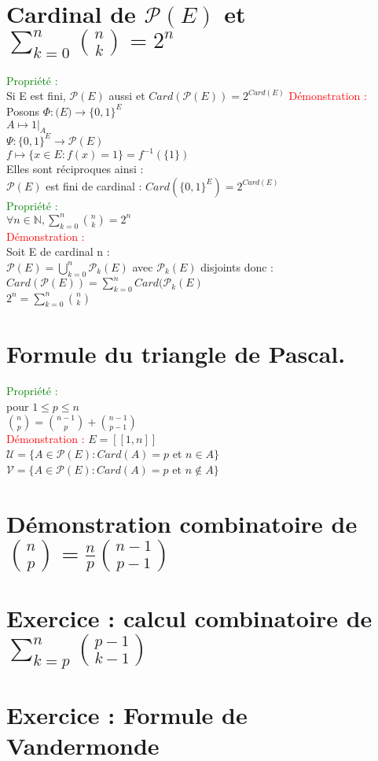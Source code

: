 \documentclass{article}
\begin{document}
\section{Cardinal de $\mathcal P (E)$ et $\sum_{k=0}^n \binom{n}{k}=2^n$ }
\textcolor{green}{Propriété :} \\
Si E est fini, $\mathcal P(E)$ aussi et $Card(\mathcal P(E))=2^{Card(E)}$
\textcolor{red}{Démonstration :} \\
Posons $\Phi : \mathcal (E) \rightarrow \lbrace 0,1 \rbrace^E$ \\
$A \mapsto 1|_{A}$ \\
$\Psi : \lbrace 0,1 \rbrace^E \rightarrow \mathcal P(E)$ \\
$f \mapsto \lbrace x \in E : f(x)=1 \rbrace=f^{-1}(\lbrace 1 \rbrace)$ \\
Elles sont réciproques ainsi : \\
$ \mathcal P(E)$ est fini de cardinal : $Card(\lbrace 0,1 \rbrace^E)=2^{Card(E)} $ \\
\textcolor{green}{Propriété :} \\
$\forall n \in \mathbb N, \sum_{k=0}^n \binom{n}{k}=2^n$ \\
\textcolor{red}{Démonstration :} \\
Soit E de cardinal n : \\
$\mathcal P(E)= \bigcup_{k=0}^n \mathcal P_k(E)$ avec $\mathcal P_k(E)$ disjoints donc : \\
$Card(\mathcal P(E))=\sum_{k=0}^n Card(\mathcal P_k(E)$ \\
$2^n=\sum_{k=0}^n \binom{n}{k}$
\section{Formule du triangle de Pascal.}
\textcolor{green}{Propriété :} \\
pour $1 \leq p \leq n$ \\
$\binom{n}{p}=\binom{n-1}{p} +\binom{n-1}{p-1}$ \\
\textcolor{red}{Démonstration :}
$E=[[1,n]]$ \\
$\mathcal U= \lbrace A \in \mathcal P(E): Card(A)=p$ et $n\in A \rbrace$ \\
$\mathcal V= \lbrace A \in \mathcal P(E) : Card(A)=p$ et $n \notin A \rbrace$ \\ 
\section{Démonstration combinatoire de $\binom{n}{p}= \frac n p \binom{n-1}{p-1}$}
\section{Exercice : calcul combinatoire de $\sum_{k=p}^n \binom{p-1}{k-1} $ }
\section{ Exercice : Formule de Vandermonde}
\end{document}
